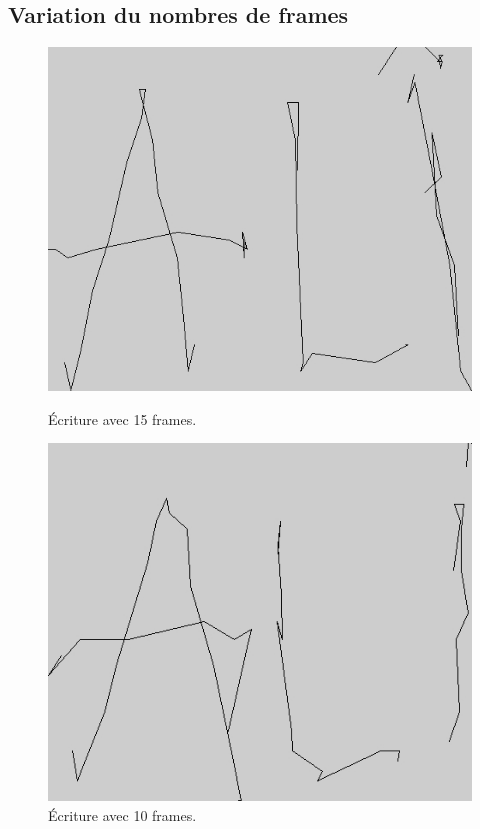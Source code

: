 \documentclass[12pt,a4paper,oneside]{book}
\begin{document}
	\subsection{Variation du nombres de frames}
	
	\begin{figure}[H]
		\begin{minipage}[H]{0.5\linewidth}
			\centering
			\includegraphics[scale=0.92]{images/12frame.jpg}
			\caption{Écriture avec 15 frames.}
			\label{fig1}
		\end{minipage}
		\begin{minipage}[H]{0.5\linewidth}
			\centering
			\includegraphics[scale=0.99]{images/8frame.jpg}
			\caption{Écriture avec 10 frames.}
		\end{minipage}
		
	\end{figure}
	
\end{document}
